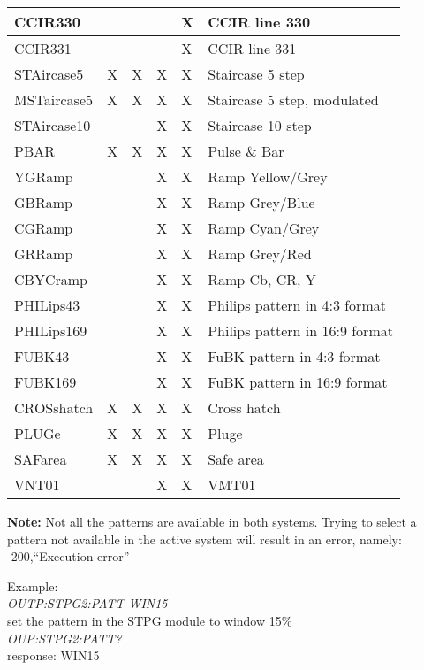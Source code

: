 \begin{tabular}{|l|l|l|l|l|l|}
CCIR330										&						&							&						& X					& CCIR line 330\\ \hline
CCIR331										&						&							&						& X					& CCIR line 331\\ \hline
STAircase5								& X					& X						& X					& X					& Staircase 5 step\\ \hline
MSTaircase5								& X					& X						& X					& X					& Staircase 5 step, modulated\\ \hline
STAircase10								&						&							& X					& X					& Staircase 10 step\\ \hline
PBAR											& X					& X						& X					& X					& Pulse \& Bar\\ \hline
YGRamp										&						&							& X					& X					& Ramp Yellow/Grey\\ \hline
GBRamp										&						&							& X					& X					& Ramp Grey/Blue\\ \hline
CGRamp										&						&							& X					& X					& Ramp Cyan/Grey\\ \hline
GRRamp										&						&							& X					& X					& Ramp Grey/Red\\ \hline
CBYCramp									&						&							& X					& X					& Ramp Cb, CR, Y\\ \hline
PHILips43									&						&							& X					& X					& Philips pattern in 4:3 format\\ \hline
PHILips169								&						&							& X					& X					& Philips pattern in 16:9 format\\ \hline
FUBK43										&						&							& X					& X					& FuBK pattern in 4:3 format\\ \hline
FUBK169										&						&							& X					& X					& FuBK pattern in 16:9 format\\ \hline
CROSshatch								& X					& X						& X					& X					& Cross hatch\\ \hline
PLUGe											& X					& X						& X					& X					& Pluge\\ \hline
SAFarea										& X					& X						& X					& X					& Safe area\\ \hline
VNT01											&						&							& X					& X					& VMT01\\ \hline
\end{tabular}

\textbf{Note:} Not all the patterns are available in both systems. Trying to select a pattern not available in the active system will result in an error, namely: -200,``Execution error'' 

Example:\\
\textit{OUTP:STPG2:PATT WIN15}\\
set the pattern in the STPG module to window 15\%\\
\textit{OUP:STPG2:PATT?}\\
response: WIN15

